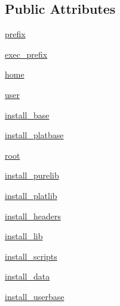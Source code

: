 \subsection*{Public Attributes}
\begin{DoxyCompactItemize}
\item 
\hyperlink{classsetuptools_1_1__distutils_1_1command_1_1install_1_1install_a6d7a458376df0713ce5c9e1017c0d53f}{prefix}
\item 
\hyperlink{classsetuptools_1_1__distutils_1_1command_1_1install_1_1install_a851e417c9261e3136a50084878491595}{exec\+\_\+prefix}
\item 
\hyperlink{classsetuptools_1_1__distutils_1_1command_1_1install_1_1install_a0c7e36965c753298a00129e0c7cc882b}{home}
\item 
\hyperlink{classsetuptools_1_1__distutils_1_1command_1_1install_1_1install_a4901afbe91d47110168535cf2eaa0820}{user}
\item 
\hyperlink{classsetuptools_1_1__distutils_1_1command_1_1install_1_1install_a3533a60a93708257033e761b47f086e4}{install\+\_\+base}
\item 
\hyperlink{classsetuptools_1_1__distutils_1_1command_1_1install_1_1install_a081017aca48b45eef9a10f41e89754db}{install\+\_\+platbase}
\item 
\hyperlink{classsetuptools_1_1__distutils_1_1command_1_1install_1_1install_a99abcc1f545eed959a073659d2a91d1b}{root}
\item 
\hyperlink{classsetuptools_1_1__distutils_1_1command_1_1install_1_1install_af581af70c5ad10e076ed86f02fac6082}{install\+\_\+purelib}
\item 
\hyperlink{classsetuptools_1_1__distutils_1_1command_1_1install_1_1install_add78bdbe00f0e1f7a8602f8dd50b182e}{install\+\_\+platlib}
\item 
\hyperlink{classsetuptools_1_1__distutils_1_1command_1_1install_1_1install_a57b9edfedc26d6b4d0f2311c981a7669}{install\+\_\+headers}
\item 
\hyperlink{classsetuptools_1_1__distutils_1_1command_1_1install_1_1install_a4f1afd28cf1bd41e92f3a12e9f816383}{install\+\_\+lib}
\item 
\hyperlink{classsetuptools_1_1__distutils_1_1command_1_1install_1_1install_a53c196d366d687b4498d35762d86d72f}{install\+\_\+scripts}
\item 
\hyperlink{classsetuptools_1_1__distutils_1_1command_1_1install_1_1install_a119e778843a8eefc24d42f7eae0e20e2}{install\+\_\+data}
\item 
\hyperlink{classsetuptools_1_1__distutils_1_1command_1_1install_1_1install_a83be50cca825ff68638460dffddcc23d}{install\+\_\+userbase}

\end{DoxyCompactItemize}
